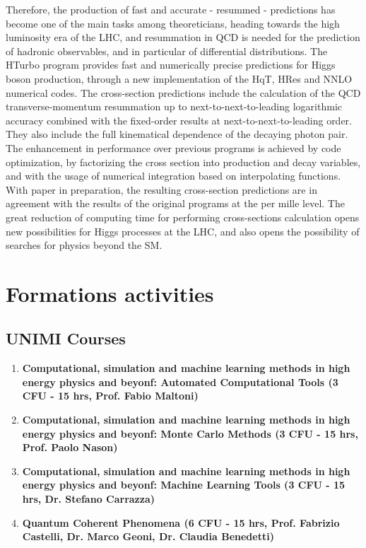 \documentclass[12pt]{article}
\begin{document}
Therefore, the production of fast and accurate - resummed - predictions has become one of the main tasks among theoreticians, heading towards the high luminosity era of the LHC, and resummation in QCD is needed for the prediction of hadronic observables, and in particular of differential distributions. The HTurbo program provides fast and numerically precise predictions for Higgs boson production, through a new implementation of the HqT, HRes and NNLO numerical codes. The cross-section predictions include the calculation of the QCD transverse-momentum resummation up to next-to-next-to-leading logarithmic accuracy combined with the fixed-order results at next-to-next-to-leading order. They also include the full kinematical dependence of the decaying photon pair. The enhancement in performance over previous programs is achieved by code optimization, by factorizing the cross section into production and decay variables, and with the usage of numerical integration based on interpolating functions. With paper in preparation, the resulting cross-section predictions are in agreement with the results of the original programs at the per mille level. The great reduction of computing time for performing cross-sections calculation opens new possibilities for Higgs processes at the LHC, and also opens the possibility of searches for physics beyond the SM.

\newpage

\section{Formations activities}

\subsection{UNIMI Courses}

\begin{enumerate}{\leftmargin 15pt \itemsep 0pt \topsep 3pt}
	\item{\bf Computational, simulation and machine learning methods in high energy physics and beyonf: Automated Computational Tools (3 CFU - 15 hrs, Prof. Fabio Maltoni)}
	\item{\bf Computational, simulation and machine learning methods in high energy physics and beyonf: Monte Carlo Methods (3 CFU - 15 hrs, Prof. Paolo Nason)}
	\item{\bf Computational, simulation and machine learning methods in high energy physics and beyonf: Machine Learning Tools (3 CFU - 15 hrs, Dr. Stefano Carrazza)}
	\item{\bf Quantum Coherent Phenomena (6 CFU - 15 hrs, Prof. Fabrizio Castelli, Dr. Marco Geoni, Dr. Claudia Benedetti)}
\end{enumerate}
\end{document}
